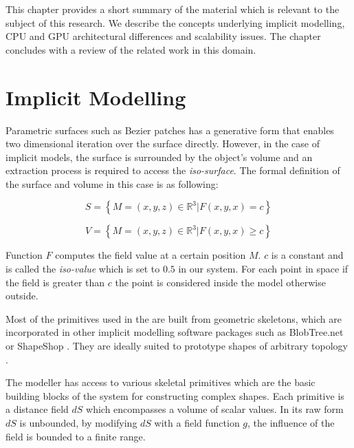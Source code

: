 \label{chapter:background}

\newlength{\savedunitlength}
\setlength{\unitlength}{2em}
This chapter provides a short summary of the material which is relevant to the subject of this research. 
We describe the concepts underlying implicit modelling, CPU and GPU architectural differences and 
scalability issues. The chapter concludes with a review of the related work in this domain.

\section{Implicit Modelling}
\label{sec:implicitmodellingintro}
Parametric surfaces such as Bezier patches has a generative form that enables 
two dimensional iteration over the surface directly. However, in the case of implicit models, 
the surface is surrounded by the object's volume and an extraction process is required to 
access the \textit{iso-surface}. The formal definition of the surface and volume in this case is as following:

\begin{equation}
S = \left\{M = (x,y,z) \in \mathbb{R}^3 | F(x,y,x) = c\right\}
\end{equation}

\begin{equation}
V = \left\{M = (x,y,z) \in \mathbb{R}^3 | F(x,y,x) \geq c\right\}
\end{equation}

Function $F$ computes the field value at a certain position $M$.  $c$ is a constant and is called the \textit{iso-value} 
which is set to $0.5$ in our system. For each point in space if the field is greater than $c$ the point is 
considered inside the model otherwise outside. 

Most of the primitives used in the \blob are built from geometric skeletons, which are incorporated in 
other implicit modelling software packages such as BlobTree.net \cite{Groot2008} or ShapeShop 
\cite{Schmidt2006}. They are ideally suited to prototype shapes of arbitrary topology \cite{Grasberger, Bloomenthal1997}. 

The modeller has access to various skeletal primitives which are the basic building blocks of the 
system for constructing complex shapes. Each primitive is a distance field $dS$ which encompasses a 
volume of scalar values. In its raw form $dS$ is unbounded, by modifying $dS$ with a field function $g$, 
the influence of the field is bounded to a finite range. 

